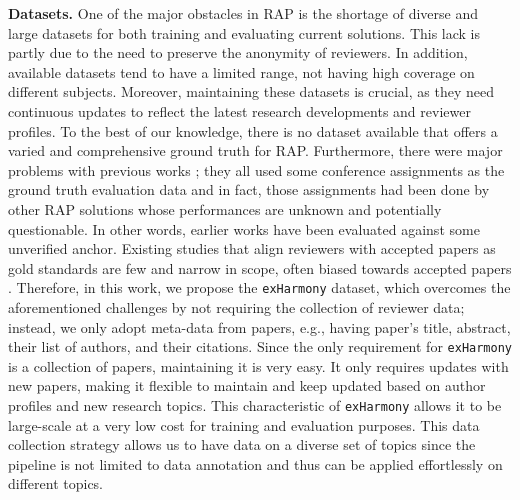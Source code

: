 \textbf{Datasets.}
One of the major obstacles in RAP is the shortage of diverse and large datasets for both training and evaluating current solutions. This lack is partly due to the need to preserve the anonymity of reviewers. In addition, available datasets tend to have a limited range, not having high coverage on different subjects. Moreover, maintaining these datasets is crucial, as they need continuous updates to reflect the latest research developments and reviewer profiles. To the best of our knowledge, there is no dataset available that offers a varied and comprehensive ground truth for RAP. 
Furthermore, there were major problems with previous works \cite{karimzadehgan2008multi,karimzadehgan2009constrained,tang2010expmatching,kou2015weighted,kou2015topicbased,Xu2020Strategyproof,mirzaei2019multiaspect,Nguyen2018ADS}; they all used some conference assignments as the ground truth evaluation data and in fact, those assignments had been done by other RAP solutions whose performances are  unknown and potentially questionable. In other words, earlier works have been evaluated against some unverified anchor. Existing studies that align reviewers with accepted papers as gold standards are few and narrow in scope, often biased towards accepted papers \cite{Xu2020Strategyproof}. Therefore, in this work, we propose the \texttt{exHarmony} dataset, which overcomes the aforementioned challenges by not requiring the collection of reviewer data; instead, we only adopt meta-data from papers, e.g., having paper's title, abstract, their list of authors, and their citations. Since the only requirement for \texttt{exHarmony} is a collection of papers, maintaining it is very easy. It only requires updates with new papers, making it flexible to maintain and keep updated based on author profiles and new research topics.
This characteristic of \texttt{exHarmony} allows it to be large-scale at a very low cost for training and evaluation purposes. This data collection strategy allows us to have data on a diverse set of topics since the pipeline is not limited to data annotation and thus can be applied effortlessly on different topics.
    
